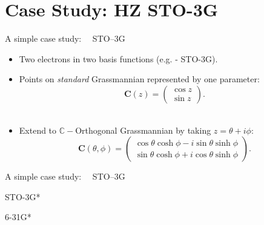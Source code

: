 \documentclass{beamer}
\begin{document}
\section{Case Study: HZ STO-3G}
\begin{frame}{A simple case study: \ \ STO--3G}
\begin{itemize}
 \item<1->{Two electrons in two basis functions (e.g.  - STO-3G).\\ }
 \item<2->{Points on \textit{standard} Grassmannian represented by one parameter:
 $$ \mathbf{C}(z) = \left(
  \begin{matrix}
  \cos z \\  \sin z
  \end{matrix} \right). $$\\ }
 \item<3->{Extend to $\mathbb{C}-$Orthogonal Grassmannian by taking $z = \theta + i \phi$:\\ 
  $$ \mathbf{C}(\theta, \phi) = \left(
  \begin{matrix}
  \cos \theta \cosh \phi - i \sin \theta \sinh \phi \\  
  \sin \theta \cosh \phi  + i \cos \theta \sinh \phi
  \end{matrix} \right). $$}
 \end{itemize}
\end{frame}

\begin{frame}{A simple case study: \ \ STO--3G}


\end{frame}

\begin{frame}{ STO-3G*}
 \vspace{-1em}
 \begin{center}

 \end{center}
\end{frame} 

\begin{frame}{ 6-31G*}
 \vspace{-1em}
 \begin{center}

 \end{center}
\end{frame} 
\end{document}
